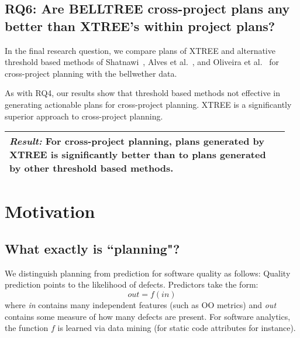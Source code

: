 \documentclass[10pt,journal,compsoc]{IEEEtran}
\begin{document}
    
\subsection*{RQ6: Are  BELLTREE  cross-project  plans  any  better  than XTREE’s within project plans?}
    
In the final research question, we compare plans of XTREE and alternative threshold based methods of Shatnawi~\cite{shatnawi}, Alves et al.~\cite{alves}, and Oliveira et al.~\cite{oliveira} for cross-project planning with the bellwether data.

As with RQ4, our results show that threshold based methods not effective in generating actionable plans for cross-project planning. XTREE is a significantly superior approach to cross-project planning.

\noindent\begin{minipage}{\linewidth}
	\begin{tabular}{|p{0.95\linewidth}|}
		\arrayrulecolor{Gray}
		\hline\vspace{-0.2cm}
		\cellcolor{Gray}\textit{\textbf{Result:}} For cross-project planning, plans 
		generated by XTREE is significantly better 
		than to plans generated by other threshold based methods.\\\hline
	\end{tabular}
\end{minipage}\bigstrut%


\section{Motivation}
\label{sect:motivate}



\subsection{What exactly is ``planning"?}

We distinguish planning from prediction for software quality as follows: 
Quality prediction points to the likelihood of defects. Predictors take the form:
\begin{equation*}
    out = f(in)    
\end{equation*}
where {\em in} contains many independent features (such as OO metrics) and {\em out} contains some measure of
how many defects are present. For software analytics, the function $f$ is learned via data mining (for static code attributes for instance).
\end{document}
